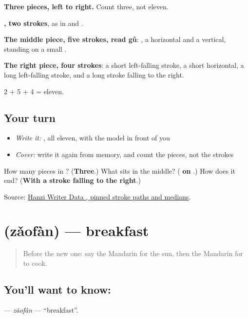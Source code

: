 \begin{quote}
\end{quote}

\textbf{Three pieces, left to right.} Count three, not eleven.

\textbf{, two strokes}, as in  and .

\textbf{The middle piece, five strokes, read gǔ}: , a horizontal and a vertical, standing on a small .

\textbf{The right piece, four strokes}: a short left-falling stroke, a short horizontal, a long left-falling stroke, and a long stroke falling to the right.

2 + 5 + 4 = eleven.

\subsection*{Your turn}
\begin{itemize}
\raggedright
  \item \emph{Write it:} , all eleven, with the model in front of you
  \item \emph{Cover:} write it again from memory, and count the pieces, not the strokes
\end{itemize}

\begin{tcolorbox}[breakable,colback=teal!4,colframe=teal!35!black,title={Before you move on}]
How many pieces in ? (\textbf{Three}.) What sits in the middle? (\textbf{ on }.) How does it end? (\textbf{With a stroke falling to the right}.)

Source: \href{https://raw.githubusercontent.com/chanind/hanzi-writer-data/68d10a4b21150cae5e1ebbd223eed289cf32d90c/data/\%E5\%81\%9A.json}{Hanzi Writer Data , pinned stroke paths and medians}.
\end{tcolorbox}
\section[\texorpdfstring{\zh{早饭} (zǎofàn)}{早饭 (zǎofàn)}]{ (zǎofàn) — breakfast}

\label{lesson:ZH-C69-zaofan}



\begin{quote}
Before the new one: say the Mandarin for the sun, then the Mandarin for to cook.
\end{quote}

\subsection*{You'll want to know: }
\textbf{} — \emph{zǎofàn} — \textquotedblleft{}breakfast\textquotedblright{}.

